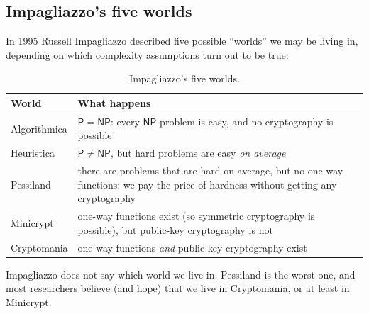 \subsection{Impagliazzo's five worlds}

In 1995 Russell Impagliazzo described five possible ``worlds'' we may be living in, depending on which complexity assumptions turn out to be true:

\begin{table}[H]
  \centering
  \small
  \begin{tabularx}{\textwidth}{@{}lX@{}}
    \toprule
    \textbf{World} & \textbf{What happens} \\
    \midrule
    Algorithmica & $\mathsf{P} = \mathsf{NP}$: every $\mathsf{NP}$ problem is easy, and no cryptography is possible \\
    Heuristica & $\mathsf{P} \neq \mathsf{NP}$, but hard problems are easy \textit{on average} \\
    Pessiland & there are problems that are hard on average, but no one-way functions: we pay the price of hardness without getting any cryptography \\
    Minicrypt & one-way functions exist (so symmetric cryptography is possible), but public-key cryptography is not \\
    Cryptomania & one-way functions \textit{and} public-key cryptography exist \\
    \bottomrule
  \end{tabularx}
  \caption{Impagliazzo's five worlds.}
\end{table}

Impagliazzo does not say which world we live in. Pessiland is the worst one, and most researchers believe (and hope) that we live in Cryptomania, or at least in Minicrypt.
